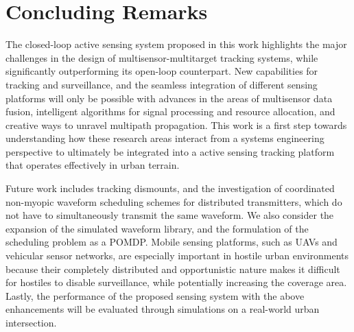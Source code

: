 \documentclass[times]{asjcauth}
\begin{document}
\section{Concluding Remarks}\label{secconc}

The closed-loop active sensing system proposed in this work highlights the major challenges in the design of multisensor-multitarget tracking systems, while significantly outperforming its open-loop counterpart. New capabilities for tracking and surveillance, and the seamless integration of different sensing platforms will only be possible with advances in the areas of multisensor data fusion, intelligent algorithms for signal processing and resource allocation, and creative ways to unravel multipath propagation. This work is a first step towards understanding how these research areas interact from a systems engineering perspective to ultimately be integrated into a active sensing tracking platform that operates effectively in urban terrain.

Future work includes tracking dismounts, and the investigation of coordinated non-myopic waveform scheduling schemes for distributed transmitters, which do not have to simultaneously transmit the same waveform. We also consider the expansion of the simulated waveform library, and the formulation of the scheduling problem as a POMDP. Mobile sensing platforms, such as UAVs and vehicular sensor networks, are especially important in hostile urban environments because their completely distributed and opportunistic nature makes it difficult for hostiles to disable surveillance, while potentially increasing the coverage area. Lastly, the performance of the proposed sensing system with the above enhancements will be evaluated through simulations on a real-world urban intersection.



\end{document}
